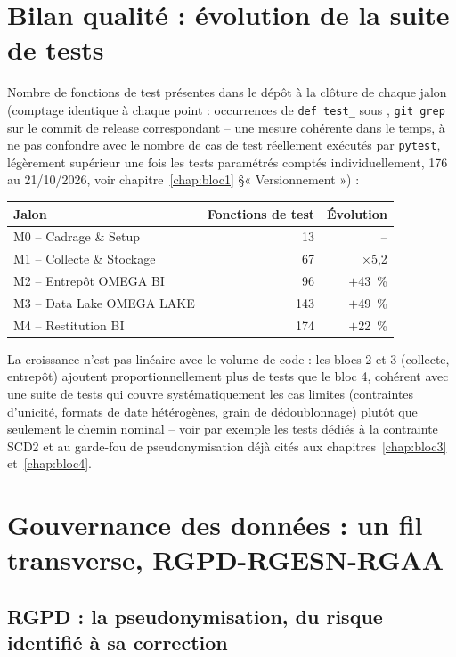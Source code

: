 \section{Bilan qualité : évolution de la suite de tests}

Nombre de fonctions de test présentes dans le dépôt à la clôture de
chaque jalon (comptage identique à chaque point : occurrences de
\texttt{def test\_} sous , \texttt{git grep} sur le
commit de release correspondant -- une mesure cohérente dans le
temps, à ne pas confondre avec le nombre de cas de test réellement
exécutés par \texttt{pytest}, légèrement supérieur une fois les tests
paramétrés comptés individuellement, 176 au 21/10/2026, voir
chapitre~\ref{chap:bloc1} §« Versionnement ») :

\begin{center}
\begin{tabular}{@{}lrr@{}}
\toprule
Jalon & Fonctions de test & Évolution \\
\midrule
M0 -- Cadrage \& Setup & 13 & -- \\
M1 -- Collecte \& Stockage & 67 & $\times$5,2 \\
M2 -- Entrepôt OMEGA BI & 96 & $+$43~\% \\
M3 -- Data Lake OMEGA LAKE & 143 & $+$49~\% \\
M4 -- Restitution BI & 174 & $+$22~\% \\
\bottomrule
\end{tabular}
\end{center}

La croissance n'est pas linéaire avec le volume de code : les blocs 2
et 3 (collecte, entrepôt) ajoutent proportionnellement plus de tests
que le bloc 4, cohérent avec une suite de tests qui couvre
systématiquement les cas limites (contraintes d'unicité, formats de
date hétérogènes, grain de dédoublonnage) plutôt que seulement le
chemin nominal -- voir par exemple les tests dédiés à la contrainte
SCD2 et au garde-fou de pseudonymisation déjà cités aux
chapitres~\ref{chap:bloc3} et~\ref{chap:bloc4}.

\section{Gouvernance des données : un fil transverse, RGPD-RGESN-RGAA}

\subsection{RGPD : la pseudonymisation, du risque identifié à sa correction}

